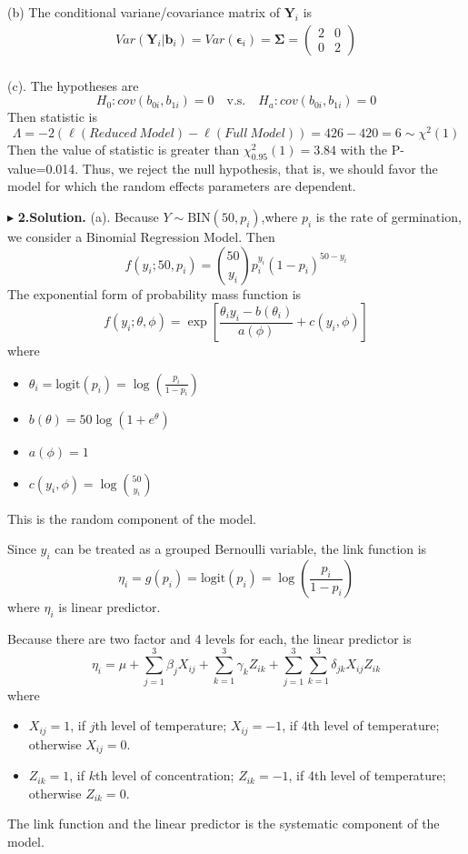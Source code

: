 \documentclass[letterpaper, 12pt]{article}
\newcommand{\ba}{$$\begin{aligned}}
\newcommand{\ea}{\end{aligned}$$}
\begin{document}
(b) The conditional variane/covariance matrix of $\bm{Y}_i$ is 
\ba
Var(\bm{Y}_i|\bm{b}_i)=Var(\bm{\epsilon}_i)=\bm{\Sigma}=\left(\begin{matrix}
2&0\\
0&2
\end{matrix}\right)\\
\ea

(c). The hypotheses are
$$
H_0:cov(b_{0i},b_{1i})=0\quad\text{v.s.}\quad H_a:cov(b_{0i},b_{1i})=0
$$
Then statistic is 
$$
\Lambda=-2(\ell(Reduced~Model)-\ell(Full~Model))=426-420=6\sim\chi^2(1)
$$
Then the value of statistic is greater than $\chi^2_{0.95}(1)=3.84$ with the P-value=0.014. Thus, we reject the null hypothesis, that is, we should favor the model for which the random effects parameters are dependent.



$\blacktriangleright$ \textbf{2.\quad Solution.} 
(a). Because $Y\sim \text{BIN}(50,p_{i})$,where $p_i$ is the rate of germination, we consider a Binomial Regression Model. Then
$$
f(y_i;50,p_i)=\binom{50}{y_i}p_i^{y_i}(1-p_i)^{50-y_i}
$$
The exponential form of probability mass function is
$$
f(y_i;\theta, \phi)=\exp\left[\frac{\theta_iy_i-b(\theta_i)}{a(\phi)}+c(y_i,\phi)\right]
$$
where
\begin{itemize}
\item $\theta_i=\text{logit}(p_i)=\log\left(\frac{p_i}{1-p_i}\right)$
\item $b(\theta)=50\log(1+e^\theta)$
\item $a(\phi)=1$
\item $c(y_i,\phi)=\log\binom{50}{y_i}$
\end{itemize}
This is the random component of the model. 

Since $y_i$ can be treated as a grouped Bernoulli variable, the link function is 
$$
\eta_i=g(p_i)=\text{logit}(p_i)=\log\left(\frac{p_i}{1-p_i}\right)
$$
where $\eta_i$ is linear predictor.

Because there are two factor and 4 levels for each, the linear predictor is
$$
\eta_i=\mu+\sum_{j=1}^{3}\beta_jX_{ij}+\sum_{k=1}^{3}\gamma_kZ_{ik}+\sum_{j=1}^{3}\sum_{k=1}^{3}\delta_{jk}X_{ij}Z_{ik}
$$
where
\begin{itemize}
\item $X_{ij}=1$, if $j$th level of temperature; $X_{ij}=-1$, if 4th level of temperature; otherwise $X_{ij}=0$.
\item $Z_{ik}=1$, if $k$th level of concentration; $Z_{ik}=-1$, if 4th level of temperature; otherwise $Z_{ik}=0$.
\end{itemize}
The link function and the linear predictor is the systematic component of the model.
\end{document}
